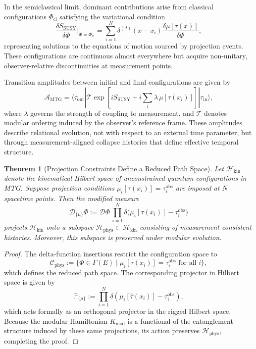 \documentclass[11pt]{article}
\newtheorem{theorem}{Theorem}
\begin{document}
In the semiclassical limit, dominant contributions arise from classical configurations \( \Phi_{\mathrm{cl}} \) satisfying the variational condition
\begin{equation}
\frac{\delta S_{\mathrm{SUSY}}}{\delta \Phi} \Big|_{\Phi = \Phi_{\mathrm{cl}}} = \sum_{i=1}^N \delta^{(d)}(x - x_i) \frac{\delta \mu[\tau(x)]}{\delta \Phi},
\end{equation}
representing solutions to the equations of motion sourced by projection events. These configurations are continuous almost everywhere but acquire non-unitary, observer-relative discontinuities at measurement points.

Transition amplitudes between initial and final configurations are given by
\begin{equation}
\mathcal{A}_{\mathrm{MTG}} = \langle \tau_{\mathrm{out}} | \mathcal{T} \exp \left[ i S_{\mathrm{SUSY}} + i \sum_i \lambda \, \mu[\tau(x_i)] \right] | \tau_{\mathrm{in}} \rangle,
\end{equation}
where \( \lambda \) governs the strength of coupling to measurement, and \( \mathcal{T} \) denotes modular ordering induced by the observer’s reference frame. These amplitudes describe relational evolution, not with respect to an external time parameter, but through measurement-aligned collapse histories that define effective temporal structure.

\begin{theorem}[Projection Constraints Define a Reduced Path Space]
Let \( \mathcal{H}_{\mathrm{kin}} \) denote the kinematical Hilbert space of unconstrained quantum configurations in MTG. Suppose projection conditions \( \mu_i[\tau(x_i)] = \tau^{\mathrm{obs}}_i \) are imposed at \( N \) spacetime points. Then the modified measure
\[
\mathcal{D}_{\{\mu\}} \Phi := \mathcal{D}\Phi \, \prod_{i=1}^N \delta\big( \mu_i[\tau(x_i)] - \tau^{\mathrm{obs}}_i \big)
\]
projects \( \mathcal{H}_{\mathrm{kin}} \) onto a subspace \( \mathcal{H}_{\mathrm{phys}} \subset \mathcal{H}_{\mathrm{kin}} \) consisting of measurement-consistent histories. Moreover, this subspace is preserved under modular evolution.
\end{theorem}

\begin{proof}
The delta-function insertions restrict the configuration space to
\[
\mathcal{C}_{\mathrm{phys}} := \{ \Phi \in \Gamma(E) \mid \mu_i[\tau(x_i)] = \tau^{\mathrm{obs}}_i \text{ for all } i \},
\]
which defines the reduced path space. The corresponding projector in Hilbert space is given by
\[
\mathbb{P}_{\{\mu\}} := \prod_{i=1}^N \delta( \mu_i[\hat{\tau}(x_i)] - \tau^{\mathrm{obs}}_i ),
\]
which acts formally as an orthogonal projector in the rigged Hilbert space. Because the modular Hamiltonian \( K_{\mathrm{mod}} \) is a functional of the entanglement structure induced by these same projections, its action preserves \( \mathcal{H}_{\mathrm{phys}} \), completing the proof.
\end{proof}
\end{document}
